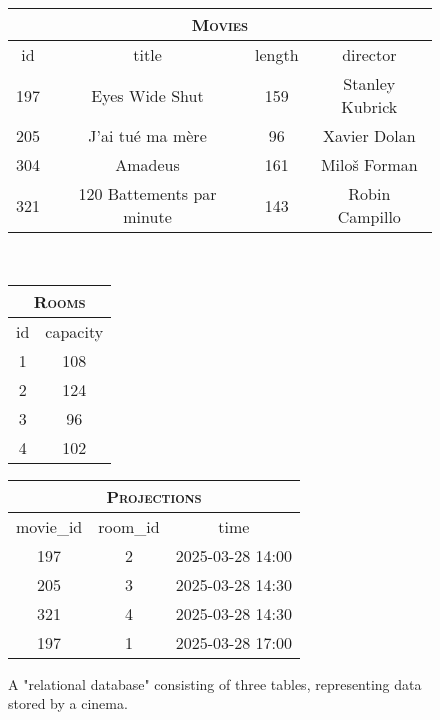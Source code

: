 \begin{figure}
	\centering%
	{%
		\footnotesize%
		\begin{tabular}{cccc}
			\multicolumn{4}{c}{\textsc{Movies}} \\ \toprule
			id & title & length & director \\ \midrule
			197 & Eyes Wide Shut & 159 & Stanley Kubrick \\ 
			205 & J'ai tué ma mère & 96 & Xavier Dolan \\
			304 & Amadeus & 161 & Miloš Forman \\
			321 & 120 Battements par minute & 143 & Robin Campillo \\ \bottomrule
		\end{tabular}
		\\\bigskip%
		\begin{tabular}{cc}
			\multicolumn{2}{c}{\textsc{Rooms}} \\ \toprule
			id & capacity  \\ \midrule
			1 & 108 \\
			2 & 124 \\
			3 & 96 \\
			4 & 102 \\ \bottomrule
		\end{tabular}%
		\hspace{1cm}%
		\begin{tabular}{ccc}
			\multicolumn{3}{c}{\textsc{Projections}} \\ \toprule
			movie\_id & room\_id & time \\ \midrule
			197 & 2 & 2025-03-28 14:00 \\
			205 & 3 & 2025-03-28 14:30 \\
			321 & 4 & 2025-03-28 14:30 \\
			197 & 1 & 2025-03-28 17:00 \\ \bottomrule
		\end{tabular}
	}
	\caption{
		\AP\label{fig:example-db-as-rel}
		A "relational database" consisting of three tables, representing data
		stored by a cinema.
	}
\end{figure}
